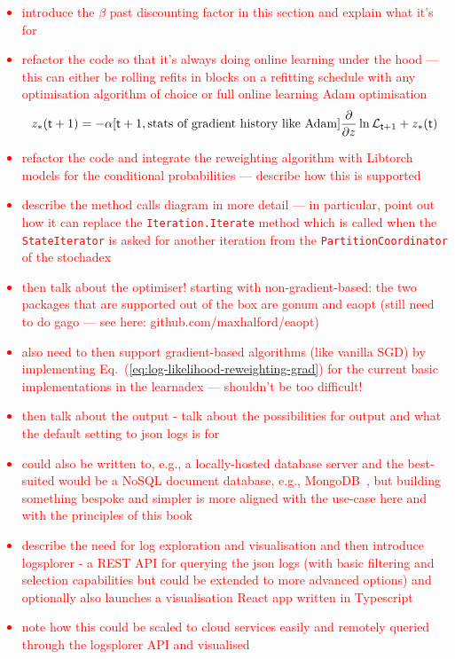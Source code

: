 \textcolor{red}{\begin{itemize}
\item{introduce the $\beta$ past discounting factor in this section and explain what it's for}
\item{refactor the code so that it's always doing online learning under the hood --- this can either be rolling refits in blocks on a refitting schedule with any optimisation algorithm of choice or full online learning Adam optimisation $$z_*({\sf t}+1) = -\alpha [{\sf t}+1,\text{stats of gradient history like Adam}] \frac{\partial}{\partial z} \ln {\cal L}_{{\sf t}+1} + z_*({\sf t})$$}
\item{refactor the code and integrate the reweighting algorithm with Libtorch models for the conditional probabilities --- describe how this is supported}
\item{describe the method calls diagram in more detail --- in particular, point out how it can replace the \texttt{Iteration.Iterate} method which is called when the \texttt{StateIterator} is asked for another iteration from the \texttt{PartitionCoordinator} of the stochadex}
\item{then talk about the optimiser! starting with non-gradient-based: the two packages that are supported out of the box are gonum and eaopt (still need to do gago --- see here: github.com/maxhalford/eaopt) }
\item{also need to then support gradient-based algorithms (like vanilla SGD) by implementing Eq.~(\ref{eq:log-likelihood-reweighting-grad}) for the current basic implementations in the learnadex --- shouldn't be too difficult!}
\item{then talk about the output - talk about the possibilities for output and what the default setting to json logs is for}
\item{could also be written to, e.g., a locally-hosted database server and the best-suited would be a NoSQL document database, e.g., MongoDB~\cite{mongodb}, but building something bespoke and simpler is more aligned with the use-case here and with the principles of this book}
\item{describe the need for log exploration and visualisation and then introduce logsplorer - a REST API for querying the json logs (with basic filtering and selection capabilities but could be extended to more advanced options) and optionally also launches a visualisation React app written in Typescript}
\item{note how this could be scaled to cloud services easily and remotely queried through the logsplorer API and visualised} 
\end{itemize}}

